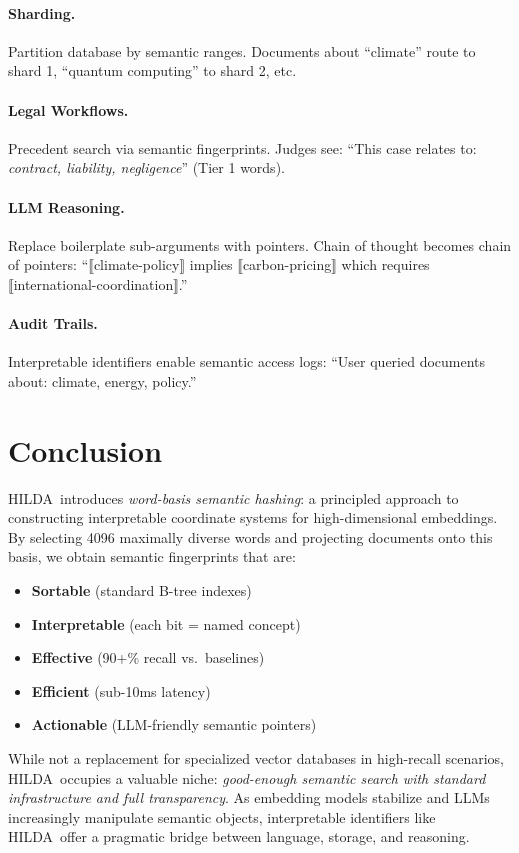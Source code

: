 \documentclass[11pt]{article}
\newcommand{\hilda}{\textsc{HILDA}}
\begin{document}
\paragraph{Sharding.} Partition database by semantic ranges. Documents about ``climate'' route to shard 1, ``quantum computing'' to shard 2, etc.

\paragraph{Legal Workflows.} Precedent search via semantic fingerprints. Judges see: ``This case relates to: \emph{contract, liability, negligence}'' (Tier 1 words).

\paragraph{LLM Reasoning.} Replace boilerplate sub-arguments with pointers. Chain of thought becomes chain of pointers: ``⟦climate-policy⟧ implies ⟦carbon-pricing⟧ which requires ⟦international-coordination⟧.''

\paragraph{Audit Trails.} Interpretable identifiers enable semantic access logs: ``User queried documents about: climate, energy, policy.''

\section{Conclusion}

\hilda\ introduces \emph{word-basis semantic hashing}: a principled approach to constructing interpretable coordinate systems for high-dimensional embeddings. By selecting 4096 maximally diverse words and projecting documents onto this basis, we obtain semantic fingerprints that are:
\begin{itemize}
  \item \textbf{Sortable} (standard B-tree indexes)
  \item \textbf{Interpretable} (each bit = named concept)
  \item \textbf{Effective} (90+\% recall vs.\ baselines)
  \item \textbf{Efficient} (sub-10ms latency)
  \item \textbf{Actionable} (LLM-friendly semantic pointers)
\end{itemize}

While not a replacement for specialized vector databases in high-recall scenarios, \hilda\ occupies a valuable niche: \emph{good-enough semantic search with standard infrastructure and full transparency}. As embedding models stabilize and LLMs increasingly manipulate semantic objects, interpretable identifiers like \hilda\ offer a pragmatic bridge between language, storage, and reasoning.
\end{document}
